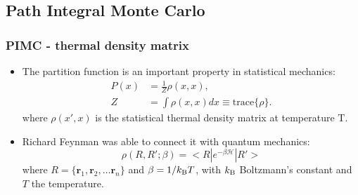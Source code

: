 \documentclass[xcolor=svgnames]{beamer}
\DeclareRobustCommand{\mc}[1]{\mathcal{#1}}
\begin{document}
	\subsection{Path Integral Monte Carlo}
        \begin{frame}
            \frametitle{PIMC - thermal density matrix}
            \begin{itemize}
                \justifying
                \item The partition function is an important property in statistical mechanics:
                \begin{equation*}
                    \begin{aligned}
                        P(x) &= \frac{1}{Z} \rho(x,x),\\
                        Z &= \int \rho(x,x) dx \equiv \text{trace} \{\rho\}.
                    \end{aligned}
                \end{equation*}
                where $\rho(x',x)$ is the statistical thermal density matrix at temperature T.
                \item Richard Feynman was able to connect it with quantum mechanics:
                \begin{equation*}\label{eq:rho}
                    \rho (R , R' ; \beta) = < R | e^{- \beta \mc{H} } | R' >
                \end{equation*}
                where $R = \{\bm{r}_1, \bm{r}_2, \ldots \bm{r}_n\}$ and $\beta = 1/k_{\rm B}T$, with $k_{\rm B}$ Boltzmann's constant and $T$ the temperature.
            \end{itemize}
        \end{frame}
\end{document}
